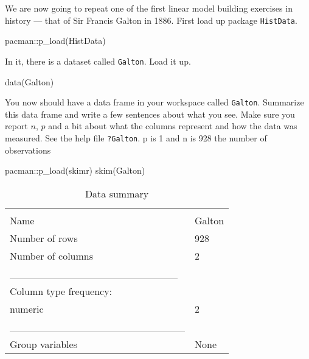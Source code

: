 \documentclass[
]{article}
\newenvironment{Shaded}{\begin{snugshade}}{\end{snugshade}}
\newcommand{\FunctionTok}[1]{\textcolor[rgb]{0.00,0.00,0.00}{#1}}
\newcommand{\NormalTok}[1]{#1}
\newcommand{\SpecialCharTok}[1]{\textcolor[rgb]{0.00,0.00,0.00}{#1}}
\begin{document}
We are now going to repeat one of the first linear model building
exercises in history --- that of Sir Francis Galton in 1886. First load
up package \texttt{HistData}.

\begin{Shaded}
\begin{Highlighting}[]
\NormalTok{pacman}\SpecialCharTok{::}\FunctionTok{p\_load}\NormalTok{(HistData)}
\end{Highlighting}
\end{Shaded}

In it, there is a dataset called \texttt{Galton}. Load it up.

\begin{Shaded}
\begin{Highlighting}[]
\FunctionTok{data}\NormalTok{(Galton)}
\end{Highlighting}
\end{Shaded}

You now should have a data frame in your workspace called
\texttt{Galton}. Summarize this data frame and write a few sentences
about what you see. Make sure you report \(n\), \(p\) and a bit about
what the columns represent and how the data was measured. See the help
file \texttt{?Galton}. p is 1 and n is 928 the number of observations

\begin{Shaded}
\begin{Highlighting}[]
\NormalTok{pacman}\SpecialCharTok{::}\FunctionTok{p\_load}\NormalTok{(skimr)}
\FunctionTok{skim}\NormalTok{(Galton)}
\end{Highlighting}
\end{Shaded}

\begin{longtable}[]{@{}ll@{}}
\caption{Data summary}\tabularnewline
\toprule
& \\
\midrule
\endfirsthead
\toprule
& \\
\midrule
\endhead
Name & Galton \\
Number of rows & 928 \\
Number of columns & 2 \\
\_\_\_\_\_\_\_\_\_\_\_\_\_\_\_\_\_\_\_\_\_\_\_ & \\
Column type frequency: & \\
numeric & 2 \\
\_\_\_\_\_\_\_\_\_\_\_\_\_\_\_\_\_\_\_\_\_\_\_\_ & \\
Group variables & None \\
\bottomrule
\end{longtable}
\end{document}

